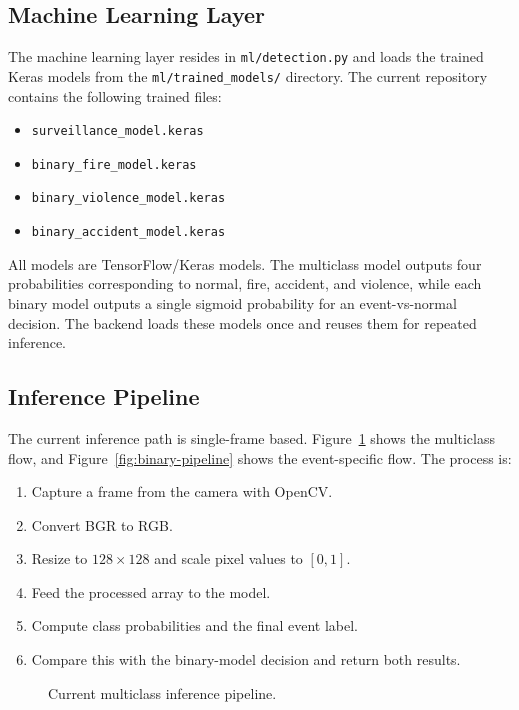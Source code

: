 \documentclass[11pt,a4paper]{article}
\begin{document}
\subsection{Machine Learning Layer}
The machine learning layer resides in \texttt{ml/detection.py} and loads the trained Keras models from the \texttt{ml/trained\_models/} directory. The current repository contains the following trained files:
\begin{itemize}[leftmargin=1.5em]
    \item \texttt{surveillance\_model.keras}
    \item \texttt{binary\_fire\_model.keras}
    \item \texttt{binary\_violence\_model.keras}
    \item \texttt{binary\_accident\_model.keras}
\end{itemize}
All models are TensorFlow/Keras models. The multiclass model outputs four probabilities corresponding to normal, fire, accident, and violence, while each binary model outputs a single sigmoid probability for an event-vs-normal decision. The backend loads these models once and reuses them for repeated inference.

\subsection{Inference Pipeline}
The current inference path is single-frame based. Figure~\ref{fig:multiclass-pipeline} shows the multiclass flow, and Figure~\ref{fig:binary-pipeline} shows the event-specific flow. The process is:
\begin{enumerate}[leftmargin=1.5em]
    \item Capture a frame from the camera with OpenCV.
    \item Convert BGR to RGB.
    \item Resize to $128\times128$ and scale pixel values to $[0,1]$.
    \item Feed the processed array to the model.
    \item Compute class probabilities and the final event label.
    \item Compare this with the binary-model decision and return both results.
\end{enumerate}

\begin{figure}[h]
\centering
{}
\caption{Current multiclass inference pipeline.}
\label{fig:multiclass-pipeline}
\end{figure}
\end{document}
